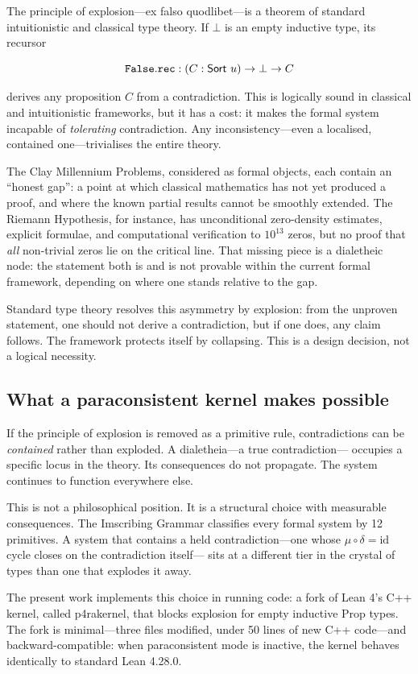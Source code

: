 \documentclass[11pt,a4paper]{article}
\theoremstyle{definition}
\begin{document}
The principle of explosion---ex falso quodlibet---is a theorem of standard
intuitionistic and classical type theory. If $\bot$ is an empty inductive type,
its recursor

\[
{\tt False.rec} : (C : {\sf Sort}\ u) \to \bot \to C
\]

derives any proposition $C$ from a contradiction. This is logically sound in
classical and intuitionistic frameworks, but it has a cost: it makes the formal
system incapable of \emph{tolerating} contradiction. Any inconsistency---even a
localised, contained one---trivialises the entire theory.

The Clay Millennium Problems, considered as formal objects, each contain an
``honest gap'': a point at which classical mathematics has not yet produced a proof,
and where the known partial results cannot be smoothly extended. The Riemann
Hypothesis, for instance, has unconditional zero-density estimates, explicit
formulae, and computational verification to $10^{13}$ zeros, but no proof that
\emph{all} non-trivial zeros lie on the critical line. That missing piece is a
dialetheic node: the statement both is and is not provable within the current
formal framework, depending on where one stands relative to the gap.

Standard type theory resolves this asymmetry by explosion: from the unproven
statement, one should not derive a contradiction, but if one does, any claim
follows. The framework protects itself by collapsing. This is a design decision,
not a logical necessity.
\subsection{What a paraconsistent kernel makes possible}

If the principle of explosion is removed as a primitive rule, contradictions can
be \emph{contained} rather than exploded. A dialetheia---a true contradiction---
occupies a specific locus in the theory. Its consequences do not propagate. The
system continues to function everywhere else.

This is not a philosophical position. It is a structural choice with measurable
consequences. The Imscribing Grammar classifies every formal system by
12 primitives. A system that contains a held contradiction---one
whose $\mu \circ \delta = \text{id}$ cycle closes on the contradiction itself---
sits at a different tier in the crystal of types than one that
explodes it away.

The present work implements this choice in running code: a fork of Lean 4's
C++ kernel, called p4rakernel, that blocks explosion for empty inductive Prop
types. The fork is minimal---three files modified, under 50 lines of new C++
code---and backward-compatible: when paraconsistent mode is inactive, the kernel
behaves identically to standard Lean 4.28.0.
\end{document}
